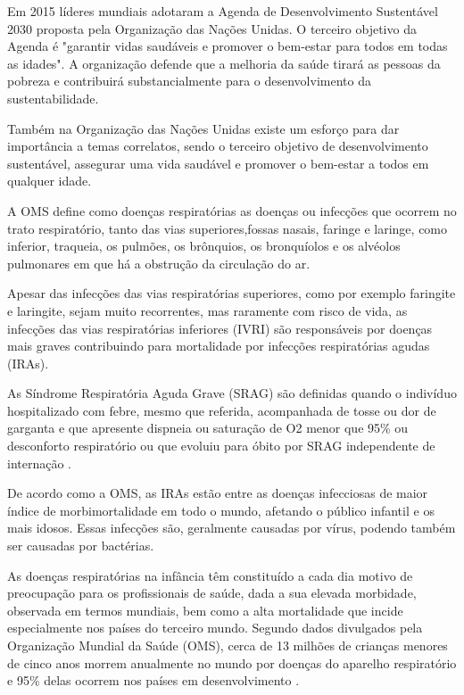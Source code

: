 \documentclass[journal]{IEEEtran}
\begin{document}
Em 2015 líderes mundiais adotaram a Agenda de Desenvolvimento Sustentável 2030 proposta pela Organização das Nações Unidas. O terceiro objetivo da Agenda é "garantir vidas saudáveis e promover o bem-estar para todos em todas as idades". A organização defende que a melhoria da saúde tirará as pessoas da pobreza e contribuirá substancialmente para o desenvolvimento da sustentabilidade.

Também na Organização das Nações Unidas existe um esforço para dar importância a temas correlatos, sendo o terceiro objetivo de desenvolvimento sustentável, assegurar uma vida saudável e promover o bem-estar a todos em qualquer idade.

A OMS define como doenças respiratórias as doenças ou infecções que ocorrem no trato respiratório, tanto das vias superiores,fossas nasais, faringe e laringe, como inferior, traqueia, os pulmões, os brônquios, os bronquíolos e os alvéolos pulmonares em que há a obstrução da circulação do ar.

Apesar das infecções das vias respiratórias superiores, como por exemplo faringite e laringite, sejam muito recorrentes, mas raramente com risco  de vida, as infecções das vias respiratórias inferiores (IVRI) são responsáveis por doenças mais graves contribuindo para mortalidade por infecções respiratórias agudas (IRAs).

As Síndrome Respiratória Aguda Grave (SRAG) são definidas quando o indivíduo hospitalizado com febre, mesmo que referida, acompanhada de tosse ou dor de garganta e que apresente dispneia ou saturação de O2 menor que 95\% ou desconforto respiratório ou que evoluiu para óbito por SRAG independente de internação \cite{definicao}.

De acordo como a OMS, as IRAs estão entre as doenças infecciosas de maior índice de morbimortalidade em todo o mundo, afetando o público infantil e os mais idosos. Essas infecções são, geralmente causadas por vírus, podendo também ser causadas por bactérias.

As doenças respiratórias na infância têm constituído a cada dia motivo de preocupação para os profissionais de saúde, dada a sua elevada morbidade, observada em termos mundiais, bem como a alta mortalidade que incide especialmente nos países do terceiro mundo. Segundo dados divulgados pela Organização Mundial da Saúde (OMS), cerca de 13 milhões de crianças menores de cinco anos morrem anualmente no mundo por doenças do aparelho respiratório e 95\% delas ocorrem nos países em desenvolvimento \cite{infantil}.
\end{document}
